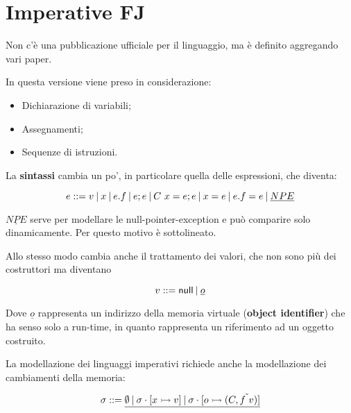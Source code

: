 


\section{Imperative FJ}

Non c'è una pubblicazione ufficiale per il linguaggio, ma è definito aggregando vari paper.

In questa versione viene preso in considerazione:

\begin{itemize}
	\item Dichiarazione di variabili;
	\item Assegnamenti;
	\item Sequenze di istruzioni.
\end{itemize}

\noindent La \textbf{sintassi} cambia un po', in particolare quella delle espressioni, che diventa:

$$
e ::= v \:|\: x \:|\: e.f \:|\: e;e \:|\: C \ x = e ; e \:|\: x = e \:|\: e.f = e \:|\: \underline{NPE}
$$

\noindent $\underline{NPE}$ serve per modellare le null-pointer-exception e può comparire solo dinamicamente. Per questo motivo è sottolineato.

Allo stesso modo cambia anche il trattamento dei valori, che non sono più dei costruttori ma diventano

$$
v ::= \Null \vbar \underline{o}
$$

\noindent Dove $\underline{o}$ rappresenta un indirizzo della memoria virtuale (\textbf{object identifier}) che ha senso solo a run-time, in quanto rappresenta un riferimento ad un oggetto costruito.

La modellazione dei linguaggi imperativi richiede anche la modellazione dei cambiamenti della memoria:

$$
\sigma ::= \underline{\emptyset \vbar \sigma \cdot [x \rat v] \vbar \sigma \cdot [o \rat (C, \tilde{f \ v})]}
$$

